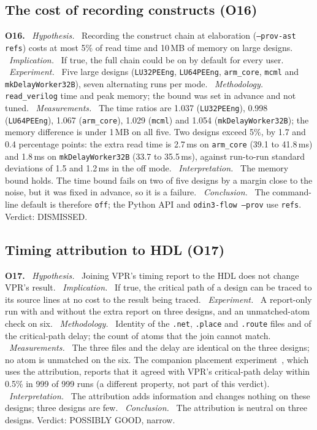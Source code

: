 \documentclass[conference]{IEEEtran}
\newcommand{\code}[1]{\texttt{#1}}
\newcommand{\argid}[1]{\par\smallskip\noindent\textbf{#1.}}
\newcommand{\ah}[1]{\ \textit{#1.}\ }
\begin{document}
\subsection{The cost of recording constructs (O16)}
\label{sec:q-cost}

\argid{O16}
\ah{Hypothesis} Recording the construct chain at elaboration (\code{--prov-ast refs}) costs at most 5\% of read time and 10\,MB of memory on large designs.
\ah{Implication} If true, the full chain could be on by default for every user.
\ah{Experiment} Five large designs (\code{LU32PEEng}, \code{LU64PEEng}, \code{arm\_core}, \code{mcml} and \code{mkDelayWorker32B}), seven alternating runs per mode.
\ah{Methodology} \code{read\_verilog} time and peak memory; the bound was set in advance and not tuned.
\ah{Measurements} The time ratios are 1.037 (\code{LU32PEEng}), 0.998 (\code{LU64PEEng}), 1.067 (\code{arm\_core}), 1.029 (\code{mcml}) and 1.054 (\code{mkDelayWorker32B}); the memory difference is under 1\,MB on all five. Two designs exceed 5\%, by 1.7 and 0.4 percentage points: the extra read time is 2.7\,ms on \code{arm\_core} (39.1 to 41.8\,ms) and 1.8\,ms on \code{mkDelayWorker32B} (33.7 to 35.5\,ms), against run-to-run standard deviations of 1.5 and 1.2\,ms in the off mode.
\ah{Interpretation} The memory bound holds. The time bound fails on two of five designs by a margin close to the noise, but it was fixed in advance, so it is a failure.
\ah{Conclusion} The command-line default is therefore \code{off}; the Python API and \code{odin3-flow --prov} use \code{refs}. Verdict: DISMISSED.

\subsection{Timing attribution to HDL (O17)}
\label{sec:q-timing}

\argid{O17}
\ah{Hypothesis} Joining VPR's timing report to the HDL does not change VPR's result.
\ah{Implication} If true, the critical path of a design can be traced to its source lines at no cost to the result being traced.
\ah{Experiment} A report-only run with and without the extra report on three designs, and an unmatched-atom check on six.
\ah{Methodology} Identity of the \code{.net}, \code{.place} and \code{.route} files and of the critical-path delay; the count of atoms that the join cannot match.
\ah{Measurements} The three files and the delay are identical on the three designs; no atom is unmatched on the six. The companion placement experiment~\cite{nornsIII}, which uses the attribution, reports that it agreed with VPR's critical-path delay within 0.5\% in 999 of 999 runs (a different property, not part of this verdict).
\ah{Interpretation} The attribution adds information and changes nothing on these designs; three designs are few.
\ah{Conclusion} The attribution is neutral on three designs. Verdict: POSSIBLY GOOD, narrow.
\end{document}
